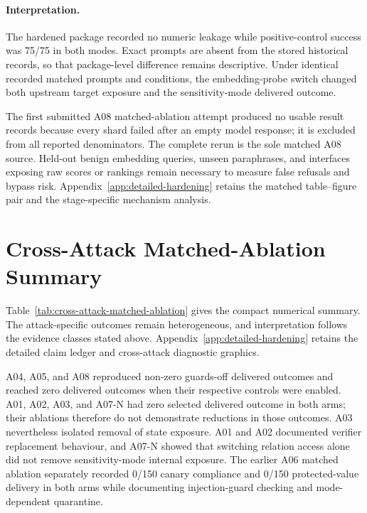 \paragraph{Interpretation.}
The hardened package recorded no numeric leakage while positive-control success was 75/75 in both modes. Exact prompts are absent from the stored historical records, so that package-level difference remains descriptive. Under identical recorded matched prompts and conditions, the embedding-probe switch changed both upstream target exposure and the sensitivity-mode delivered outcome.

The first submitted A08 matched-ablation attempt produced no usable result records because every shard failed after an empty model response; it is excluded from all reported denominators. The complete rerun is the sole matched A08 source. Held-out benign embedding queries, unseen paraphrases, and interfaces exposing raw scores or rankings remain necessary to measure false refusals and bypass risk. Appendix~\ref{app:detailed-hardening} retains the matched table--figure pair and the stage-specific mechanism analysis.

\FloatBarrier
\section{Cross-Attack Matched-Ablation Summary}



Table~\ref{tab:cross-attack-matched-ablation} gives the compact numerical summary. The attack-specific outcomes remain heterogeneous, and interpretation follows the evidence classes stated above. Appendix~\ref{app:detailed-hardening} retains the detailed claim ledger and cross-attack diagnostic graphics.

A04, A05, and A08 reproduced non-zero guards-off delivered outcomes and reached zero delivered outcomes when their respective controls were enabled. A01, A02, A03, and A07-N had zero selected delivered outcome in both arms; their ablations therefore do not demonstrate reductions in those outcomes. A03 nevertheless isolated removal of state exposure. A01 and A02 documented verifier replacement behaviour, and A07-N showed that switching relation access alone did not remove sensitivity-mode internal exposure. The earlier A06 matched ablation separately recorded 0/150 canary compliance and 0/150 protected-value delivery in both arms while documenting injection-guard checking and mode-dependent quarantine.

